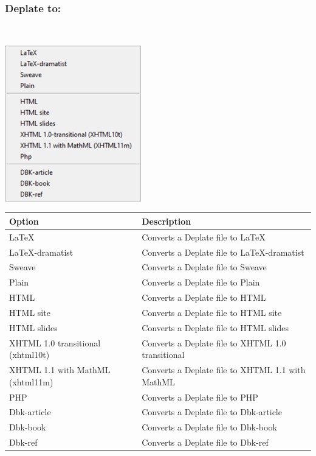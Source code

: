 \hypertarget{menu_tools_processing_conversion_deplate}{}
\subsubsection{Deplate to:}\\

\includegraphics[scale=0.50]{./res/menu_tools_processing_conversion_deplate.png}\\

\begin{scriptsize}
  \begin{tabularx}{\textwidth}{>{\hsize=0.6\hsize}X>{\hsize=0.7\hsize}X}\\
    \hline
    \textbf{Option} & \textbf{Description} \\
    \hline
    \LaTeX & Converts a Deplate file to \LaTeX \\
    LaTeX-dramatist & Converts a Deplate file to LaTeX-dramatist \\
    Sweave & Converts a Deplate file to Sweave \\
    Plain & Converts a Deplate file to Plain \\
    \hdashline[1pt/1pt]
    HTML & Converts a Deplate file to HTML \\
    HTML site & Converts a Deplate file to HTML site \\
    HTML slides & Converts a Deplate file to HTML slides \\
    XHTML 1.0 transitional (xhtml10t) & Converts a Deplate file to XHTML 1.0 transitional \\
    XHTML 1.1 with MathML (xhtml11m) & Converts a Deplate file to XHTML 1.1 with MathML \\
    PHP & Converts a Deplate file to PHP \\
    \hdashline[1pt/1pt]
    Dbk-article & Converts a Deplate file to Dbk-article \\
    Dbk-book & Converts a Deplate file to Dbk-book \\
    Dbk-ref & Converts a Deplate file to Dbk-ref \\
    \hline
  \end{tabularx}
\end{scriptsize}

